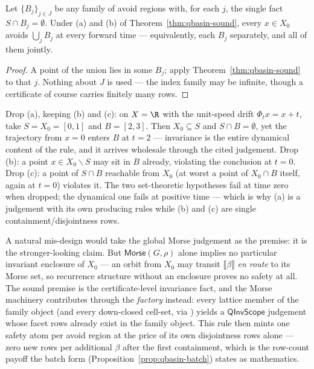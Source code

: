 \begin{bprop}\label{prop:qbasin-batch}
Let $\{B_j\}_{j \in J}$ be any family of avoid regions with, for each
$j$, the single fact $S \cap B_j = \emptyset$. Under (a) and (b) of
Theorem~\ref{thm:qbasin-sound}, every $x \in X_0$ avoids
$\bigcup_j B_j$ at every forward time --- equivalently, each $B_j$
separately, and all of them jointly.
\end{bprop}
\begin{proof}
A point of the union lies in some $B_j$; apply
Theorem~\ref{thm:qbasin-sound} to that $j$. Nothing about $J$ is used ---
the index family may be infinite, though a certificate of course carries
finitely many rows.
\end{proof}

\begin{bremark}\label{rem:qbasin-hyp}
Drop (a), keeping (b) and (c): on $X = \R$ with the unit-speed drift
$\Phi_t x = x + t$, take $S = X_0 = [0,1]$ and $B = [2,3]$. Then
$X_0 \subseteq S$ and $S \cap B = \emptyset$, yet the trajectory from
$x = 0$ enters $B$ at $t = 2$ --- invariance is the entire dynamical
content of the rule, and it arrives wholesale through the cited
judgement. Drop (b): a point $x \in X_0 \smallsetminus S$ may sit in $B$
already, violating the conclusion at $t = 0$. Drop (c): a point of
$S \cap B$ reachable from $X_0$ (at worst a point of
$X_0 \cap B$ itself, again at $t = 0$) violates it. The two set-theoretic
hypotheses fail at time zero when dropped; the dynamical one fails at
positive time --- which is why (a) is a judgement with its own producing
rules while (b) and (c) are single containment/disjointness rows.
\end{bremark}

\begin{bremark}\label{rem:qbasin-premise}
A natural mis-design would take the global Morse judgement as the
premise: it is the stronger-looking claim. But
$\mathsf{Morse}(G, \rho)$ alone implies no particular invariant
enclosure of $X_0$ --- an orbit from $X_0$ may transit
$\llbracket\beta\rrbracket$ \emph{en route} to its Morse set, so
recurrence structure without an enclosure proves no safety at all. The
sound premise is the certificate-level invariance fact, and the Morse
machinery contributes through the \emph{factory} instead: every lattice
member of the family object (and every down-closed cell-set, via
) yields a $\mathsf{QInvScope}$ judgement whose
facet rows already exist in the family object. This rule then mints one
safety atom per avoid region at the price of its own disjointness rows
alone --- zero new rows per additional $\beta$ after the first
containment, which is the row-count payoff the batch form
(Proposition~\ref{prop:qbasin-batch}) states as mathematics.
\end{bremark}

